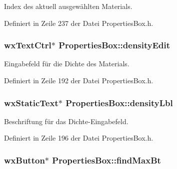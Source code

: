 Index des aktuell ausgewählten Materials. 



Definiert in Zeile 237 der Datei Properties\-Box.\-h.

\hypertarget{classPropertiesBox_a0c71f6f0ea002a57ac0750e8ae9cdf13}{
\subsubsection[{density\-Edit}]{\setlength{\rightskip}{0pt plus 5cm}wx\-Text\-Ctrl$\ast$ Properties\-Box\-::density\-Edit\hspace{0.3cm}{\ttfamily [private]}}}\label{classPropertiesBox_a0c71f6f0ea002a57ac0750e8ae9cdf13}


Eingabefeld für die Dichte des Materials. 



Definiert in Zeile 192 der Datei Properties\-Box.\-h.

\hypertarget{classPropertiesBox_a1c670a16a13cb03338867a35508f7f5a}{
\subsubsection[{density\-Lbl}]{\setlength{\rightskip}{0pt plus 5cm}wx\-Static\-Text$\ast$ Properties\-Box\-::density\-Lbl\hspace{0.3cm}{\ttfamily [private]}}}\label{classPropertiesBox_a1c670a16a13cb03338867a35508f7f5a}


Beschriftung für das Dichte-\/\-Eingabefeld. 



Definiert in Zeile 196 der Datei Properties\-Box.\-h.

\hypertarget{classPropertiesBox_af03e4a7248c0cb91f3978eadc0936c61}{
\subsubsection[{find\-Max\-Bt}]{\setlength{\rightskip}{0pt plus 5cm}wx\-Button$\ast$ Properties\-Box\-::find\-Max\-Bt\hspace{0.3cm}{\ttfamily [private]}}}\label{classPropertiesBox_af03e4a7248c0cb91f3978eadc0936c61}


